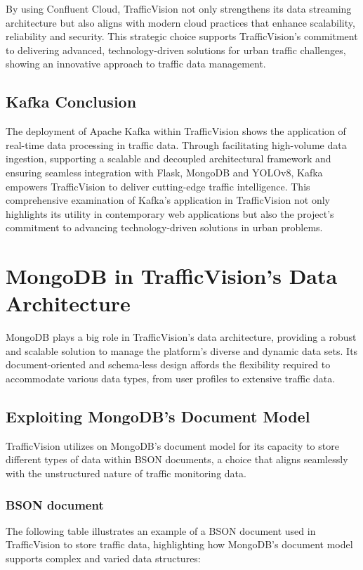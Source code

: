 By using Confluent Cloud, TrafficVision not only strengthens its data streaming architecture but also aligns with modern cloud practices that enhance scalability, reliability and security. This strategic choice supports TrafficVision's commitment to delivering advanced, technology-driven solutions for urban traffic challenges, showing an innovative approach to traffic data management.



\subsection{Kafka Conclusion}
The deployment of Apache Kafka within TrafficVision shows the application of real-time data processing in traffic data. Through facilitating high-volume data ingestion, supporting a scalable and decoupled architectural framework and ensuring seamless integration with Flask, MongoDB and YOLOv8, Kafka empowers TrafficVision to deliver cutting-edge traffic intelligence. This comprehensive examination of Kafka's application in TrafficVision not only highlights its utility in contemporary web applications but also the project's commitment to advancing technology-driven solutions in urban problems.


\section{MongoDB in TrafficVision's Data Architecture}
MongoDB plays a big role in TrafficVision's data architecture, providing a robust and scalable solution to manage the platform's diverse and dynamic data sets. Its document-oriented and schema-less design affords the flexibility required to accommodate various data types, from user profiles to extensive traffic data.

\subsection{Exploiting MongoDB's Document Model}
TrafficVision utilizes on MongoDB's document model for its capacity to store different types of data within BSON documents, a choice that aligns seamlessly with the unstructured nature of traffic monitoring data.

\subsubsection{BSON document}

The following table illustrates an example of a BSON document used in TrafficVision to store traffic data, highlighting how MongoDB's document model supports complex and varied data structures:


